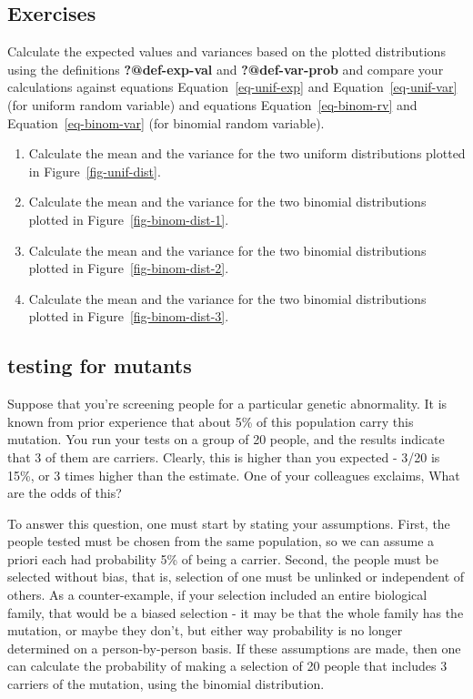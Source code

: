 \documentclass[
  letterpaper,
  DIV=11,
  numbers=noendperiod]{scrreprt}
\begin{document}
\hypertarget{exercises-24}{%
\subsection{Exercises}\label{exercises-24}}

Calculate the expected values and variances based on the plotted
distributions using the definitions \textbf{?@def-exp-val} and
\textbf{?@def-var-prob} and compare your calculations against equations
Equation~\ref{eq-unif-exp} and Equation~\ref{eq-unif-var} (for uniform
random variable) and equations Equation~\ref{eq-binom-rv} and
Equation~\ref{eq-binom-var} (for binomial random variable).

\begin{enumerate}
\def\labelenumi{\arabic{enumi}.}
\item
  Calculate the mean and the variance for the two uniform distributions
  plotted in Figure~\ref{fig-unif-dist}.
\item
  Calculate the mean and the variance for the two binomial distributions
  plotted in Figure~\ref{fig-binom-dist-1}.
\item
  Calculate the mean and the variance for the two binomial distributions
  plotted in Figure~\ref{fig-binom-dist-2}.
\item
  Calculate the mean and the variance for the two binomial distributions
  plotted in Figure~\ref{fig-binom-dist-3}.
\end{enumerate}

\hypertarget{testing-for-mutants}{%
\subsection{testing for mutants}\label{testing-for-mutants}}

Suppose that you're screening people for a particular genetic
abnormality. It is known from prior experience that about 5\% of this
population carry this mutation. You run your tests on a group of 20
people, and the results indicate that 3 of them are carriers. Clearly,
this is higher than you expected - 3/20 is 15\%, or 3 times higher than
the estimate. One of your colleagues exclaims, What are the odds of
this?

To answer this question, one must start by stating your assumptions.
First, the people tested must be chosen from the same population, so we
can assume a priori each had probability 5\% of being a carrier. Second,
the people must be selected without bias, that is, selection of one must
be unlinked or independent of others. As a counter-example, if your
selection included an entire biological family, that would be a biased
selection - it may be that the whole family has the mutation, or maybe
they don't, but either way probability is no longer determined on a
person-by-person basis. If these assumptions are made, then one can
calculate the probability of making a selection of 20 people that
includes 3 carriers of the mutation, using the binomial distribution.
\end{document}
